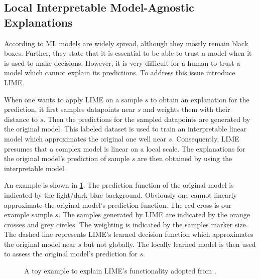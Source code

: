\subsection{Local Interpretable Model-Agnostic Explanations}
\label{chp:fundamentals:sec:machine_learning:subsec:LIME}
According to \textcite{Ribeiro:2016} \ac{ML} models are widely spread, although they mostly remain black boxes.
Further, they state that it is essential to be able to trust a model when it is used to make decisions.
However, it is very difficult for a human to trust a model which cannot explain its predictions.
To address this issue \textcite{Ribeiro:2016} introduce \ac{LIME}.

When one wants to apply \ac{LIME} on a sample $s$ to obtain an explanation for the prediction, it first samples datapoints near $s$ and weights them with their distance to $s$.
Then the predictions for the sampled datapoints are generated by the original model.
This labeled dataset is used to train an interpretable linear model which approximates the original one well near $s$.
Consequently, \ac{LIME} presumes that a complex model is linear on a local scale.
The explanations for the original model's prediction of sample $s$ are then obtained by using the interpretable model. \parencite{Ribeiro:2016}

An example is shown in \cref{fig:fundamentals:LIME}.
The prediction function of the original model is indicated by the light/dark blue background.
Obviously one cannot linearly approximate the original model's prediction function.
The red cross is our example sample $s$.
The samples generated by \ac{LIME} are indicated by the orange crosses and grey circles.
The weighting is indicated by the samples marker size.
The dashed line represents \ac{LIME}'s learned decision function which approximates the original model near $s$ but not globally.
The locally learned model is then used to assess the original model's prediction for $s$.
\begin{figure}[htpb]
    \centering
    
    \caption[LIME Example Data]{A toy example to explain \ac{LIME}'s functionality adopted from \textcite{Ribeiro:2016}.}\label{fig:fundamentals:LIME}
\end{figure}

